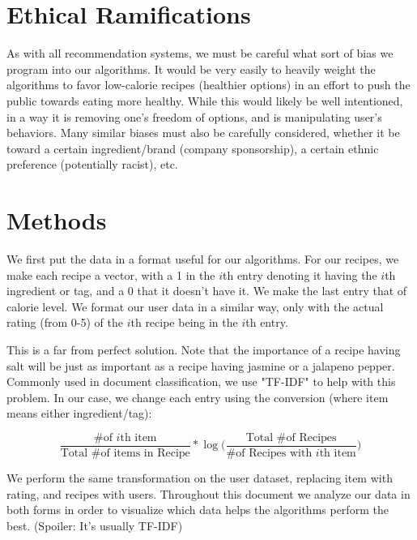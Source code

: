 \documentclass[11pt]{article}
\newcommand*\textfrac[2]{
  \frac{\text{#1}}{\text{#2}}
}
\begin{document}
\section{Ethical Ramifications}
As with all recommendation systems, we must be careful what sort of bias we program into our algorithms. It would be very easily to heavily weight the algorithms to favor low-calorie recipes (healthier options) in an effort to push the public towards eating more healthy. While this would likely be well intentioned, in a way it is removing one's freedom of options, and is manipulating user's behaviors. Many similar biases must also be carefully considered, whether it be toward a certain ingredient/brand (company sponsorship), a certain ethnic preference (potentially racist), etc.

\section{Methods}

We first put the data in a format useful for our algorithms. For our recipes, we make each recipe a vector, with a 1 in the $i$th entry denoting it having the $i$th ingredient or tag, and a 0 that it doesn't have it. We make the last entry that of calorie level. We format our user data in a similar way, only with the actual rating (from 0-5) of the $i$th recipe being in the $i$th entry.

This is a far from perfect solution. Note that the importance of a recipe having salt will be just as important as a recipe having jasmine or a jalapeno pepper. Commonly used in document classification, we use "TF-IDF" to help with this problem. In our case, we change each entry using the conversion (where item means either ingredient/tag):

$$\textfrac{\# of $i$th item}{Total \# of items in Recipe} * \log \Big( \textfrac{Total \# of Recipes}{\# of Recipes with $i$th item} \Big)$$

We perform the same transformation on the user dataset, replacing item with rating, and recipes with users. Throughout this document we analyze our data in both forms in order to visualize which data helps the algorithms perform the best. (Spoiler: It's usually TF-IDF)
\end{document}
